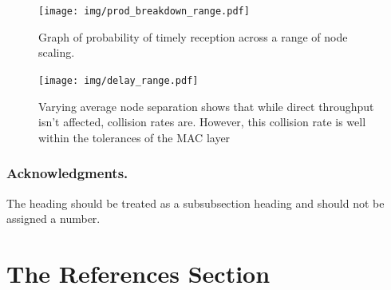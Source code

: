 \documentclass[runningheads,a4paper]{llncs}
\begin{document}
\begin{figure}[h!]
  \centering
  \texttt{[image: img/prod\_breakdown\_range.pdf]}
  \caption{Graph of probability of timely reception across a range of node scaling.}
  \label{fig:prod_breakdown_range}
\end{figure}

\begin{figure}[h!]
  \centering
  \texttt{[image: img/delay\_range.pdf]}
  \caption{Varying average node separation shows that while direct throughput isn't affected, collision rates are. However, this collision rate is well within the tolerances of the MAC layer}
  \label{fig:delay_range}
\end{figure}


\subsubsection*{Acknowledgments.} The heading should be treated as a
subsubsection heading and should not be assigned a number.

\section{The References Section}\label{references}



% 
% 
% 
% 
% 
% 
% 
% 
\end{document}
